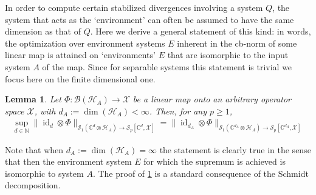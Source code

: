 \documentclass[11pt]{article}
\DeclareMathOperator{\id}{id}
\newcommand{\1}{\ensuremath{\mathbbm{1}}}
\theoremstyle{newdefinition}
\theoremstyle{newplain}
\newtheorem{lemma}[definition]{Lemma}
\theoremstyle{myplain}
\begin{document}
In order to compute certain stabilized divergences involving a system $Q$, the system that acts as the `environment' can often be assumed to have the same dimension as that of $Q$. Here we derive a general statement of this kind: in words, the optimization over environment systems $E$ inherent in the cb-norm of some linear map is attained on `environments' $E$ that are isomorphic to the input system $A$ of the map. Since for separable systems this statement is trivial we focus here on the finite dimensional one.
\begin{lemma} \label{lem:finiteEnvironement}
   Let $\Phi:\mathcal{B}(\mathcal{H}_A)\to \mathcal{X}$ be a linear map onto an arbitrary operator space $\mathcal{X}$, with $d_A:=\dim(\mathcal{H}_A)<\infty$. Then, for any $p\ge 1$,
   \begin{align}
\sup_{d\in\mathbb{N}}\|\id_{d}\otimes \Phi\|_{\mathcal{S}_1(\mathbb{C}^d\otimes \mathcal{H}_A)\to \mathcal{S}_p[\mathbb{C}^d,\mathcal{X}]}=\|\id_{d_A}\otimes \Phi\|_{\mathcal{S}_1(\mathbb{C}^{d_A}\otimes \mathcal{H}_A)\to \mathcal{S}_p[\mathbb{C}^{d_A},\mathcal{X}]}
   \end{align}   
\end{lemma}
Note that when $d_A:=\dim(\mathcal{H}_A)=\infty$ the statement is clearly true in the sense that then the environment system $E$ for which the supremum is achieved is isomorphic to system $A$.
The proof of \cref{lem:finiteEnvironement} is a standard consequence of the Schmidt decomposition.
\end{document}
